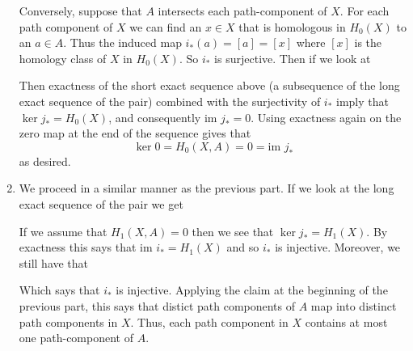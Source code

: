 \documentclass{article}
\newcommand{\im}{\text{im }}
\begin{document}
\begin{solution}{\parindent}
\begin{enumerate}
    Conversely, suppose that $A$ intersects each path-component of
    $X$. For each path component of $X$ we can find an $x \in X$ that
    is homologous in $H_0(X)$ to an $a \in A$. Thus the induced map
    $i_\ast(a) = [a] = [x]$ where $[x]$ is the homology class of $X$
    in $H_0(X)$. So $i_\ast$ is surjective. Then if we look at
    \begin{center}
    \end{center}
    Then exactness of the short exact sequence above (a subsequence of
    the long exact sequence of the pair) combined with the
    surjectivity of $i_\ast$ imply that $\ker j_\ast = H_0(X)$, and
    consequently $\im j_\ast = 0$. Using exactness again on the zero
    map at the end of the sequence gives that 
    \[
    \ker 0 = H_0(X,A) = 0 = \im j_\ast
    \]
    as desired.
  \item We proceed in a similar manner as the previous part. If we
    look at the long exact sequence of the pair we get
    \begin{center}
    \end{center}
    If we assume that $H_1(X,A) = 0$ then we see that $\ker j_\ast =
    H_1(X)$. By exactness this says that $\im i_\ast = H_1(X)$ and so
    $i_\ast$ is injective. Moreover, we still have that
    \begin{center}
    \end{center}
    Which says that $i_\ast$ is injective. Applying the claim at the
    beginning of the previous part, this says that distict path
    components of $A$ map into distinct path components in $X$. Thus,
    each path component in $X$ contains at most one path-component
    of $A$.


\end{enumerate}
\end{solution}
\end{document}
